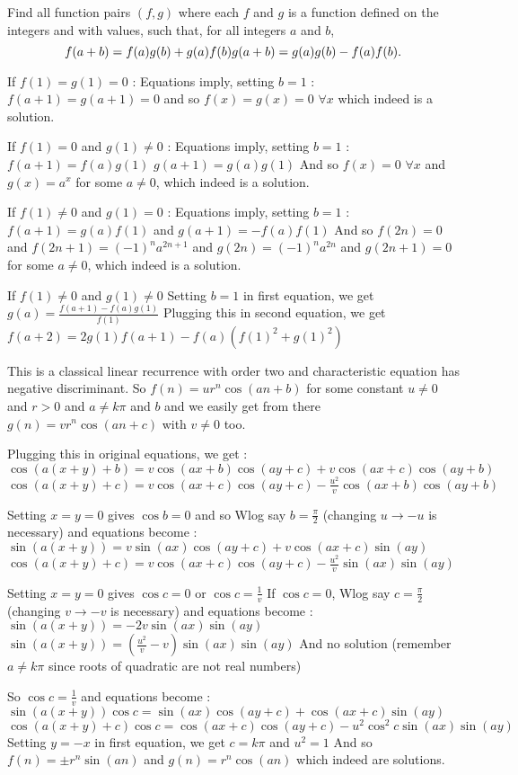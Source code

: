 \begin{solution}
	\begin{tcolorbox}Find all function pairs $(f,g)$ where each $f$ and $g$ is a function defined on the integers and with values, such that, for all integers $a$ and $b$, 
\[f(a+b)=f(a)g(b)+g(a)f(b)\\
g(a+b)=g(a)g(b)-f(a)f(b).\]\end{tcolorbox}
If $f(1)=g(1)=0$ :
Equations imply, setting $b=1$ : $f(a+1)=g(a+1)=0$ and so $f(x)=g(x)=0$ $\forall x$ which indeed is a solution.

If $f(1)=0$ and $g(1)\ne 0$ :
Equations imply, setting $b=1$ : 
$f(a+1)=f(a)g(1)$ 
$g(a+1)=g(a)g(1)$ 
And so $f(x)=0$ $\forall x$ and $g(x)=a^x$ for some $a\ne 0$, which indeed is a solution.

If $f(1)\ne 0$ and $g(1)=0$ :
Equations imply, setting $b=1$ : $f(a+1)=g(a)f(1)$ and $g(a+1)=-f(a)f(1)$
And so $f(2n)=0$ and $f(2n+1)=(-1)^na^{2n+1}$ and $g(2n)=(-1)^na^{2n}$ and $g(2n+1)=0$ for some $a\ne 0$, which indeed is a solution.

If $f(1)\ne 0$ and $g(1)\ne 0$
Setting $b=1$ in first equation, we get $g(a)=\frac{f(a+1)-f(a)g(1)}{f(1)}$
Plugging this in second equation, we get $f(a+2)=2g(1)f(a+1)-f(a)(f(1)^2+g(1)^2)$

This is a classical linear recurrence with order two and characteristic equation has negative discriminant.
So $f(n)=ur^n\cos(an+b)$ for some constant $u\ne 0$ and $r>0$ and $a\ne k\pi$ and $b$ and we easily get from there 
$g(n)=vr^n\cos(an+c)$ with $v\ne 0$ too.

Plugging this in original equations, we get :
$\cos(a(x+y)+b)=v\cos(ax+b)\cos(ay+c)+v\cos(ax+c)\cos(ay+b)$
$\cos(a(x+y)+c)=v\cos(ax+c)\cos(ay+c)-\frac{u^2}v\cos(ax+b)\cos(ay+b)$

Setting $x=y=0$ gives $\cos b=0$ and so Wlog say $b=\frac{\pi}2$ (changing $u\to -u$ is necessary) and equations become :
$\sin(a(x+y))=v\sin(ax)\cos(ay+c)+v\cos(ax+c)\sin(ay)$
$\cos(a(x+y)+c)=v\cos(ax+c)\cos(ay+c)-\frac{u^2}v\sin(ax)\sin(ay)$

Setting $x=y=0$ gives $\cos c=0$ or $\cos c=\frac 1v$
If $\cos c=0$, Wlog say $c=\frac{\pi}2$ (changing $v\to -v$ is necessary) and equations become :
$\sin(a(x+y))=-2v\sin(ax)\sin(ay)$
$\sin(a(x+y))=(\frac{u^2}v-v)\sin(ax)\sin(ay)$
And no solution (remember $a\ne k\pi$ since roots of quadratic are not real numbers)

So $\cos c=\frac 1v$ and equations become :
$\sin(a(x+y))\cos c=\sin(ax)\cos(ay+c)+\cos(ax+c)\sin(ay)$
$\cos(a(x+y)+c)\cos c=\cos(ax+c)\cos(ay+c)-u^2\cos^2 c\sin(ax)\sin(ay)$
Setting $y=-x$ in first equation, we get $c=k\pi$ and $u^2=1$
And so $f(n)=\pm r^n\sin(an)$ and $g(n)=r^n\cos(an)$ which indeed are solutions.


\end{solution}
